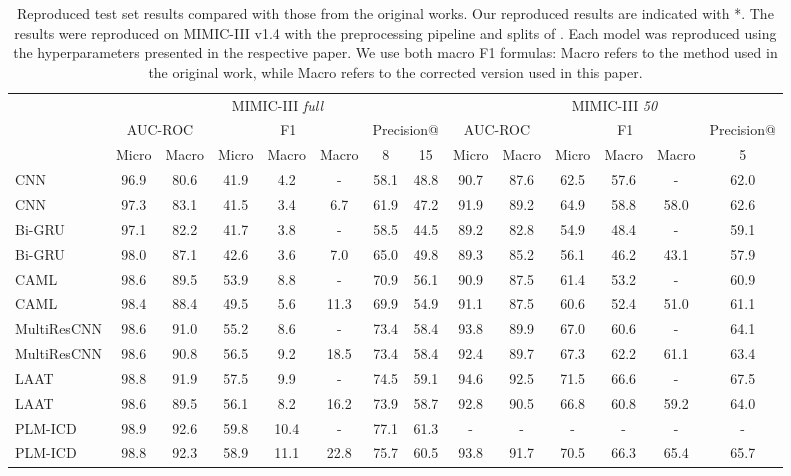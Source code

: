 \documentclass[anonymous=false, sigconf=true, review=false, natbib=true]{acmart}
\begin{document}
\begin{table*}[t]
\centering
\caption{Reproduced test set results compared with those from the original works. Our reproduced results are indicated with *. The results were reproduced on MIMIC-III v1.4 with the preprocessing pipeline and splits of \citet{mullenbachExplainablePredictionMedical2018}. Each model was reproduced using the hyperparameters presented in the respective paper. We use both macro F1 formulas: Macro refers to the method used in the original work, while Macro refers to the corrected version used in this paper.}
\label{tab:reproduced_results}
\begin{tabular}{l  cc  ccc  cc  cc  ccc  c}
    \toprule
     & \multicolumn{7}{c}{MIMIC-III \textit{full}} & \multicolumn{6}{c}{MIMIC-III \textit{50}} \\
     \cmidrule(lr){2-8}\cmidrule(lr){9-14}
     & \multicolumn{2}{c}{AUC-ROC} & \multicolumn{3}{c}{F1} & \multicolumn{2}{c}{Precision@}  & \multicolumn{2}{c}{AUC-ROC} & \multicolumn{3}{c}{F1} & Precision@  \\
     & Micro & Macro & Micro & Macro & Macro & 8 & 15 & Micro & Macro & Micro & Macro & Macro & 5 \\
    \midrule
    CNN &  96.9 & 80.6 &  41.9& 4.2 & -& 58.1 &  48.8  & 90.7 & 87.6 & 62.5 & 57.6 & - & 62.0  \\
    CNN & 97.3 & 83.1 & 41.5 & 3.4 & 6.7 & 61.9 & 47.2 & 91.9 & 89.2 & 64.9 & 58.8 & 58.0 &  62.6 \\
    \hline
    Bi-GRU & 97.1 & 82.2 & 41.7 & 3.8 & - & 58.5 & 44.5  &  89.2 & 82.8 & 54.9 &  48.4 & - &  59.1  \\
    Bi-GRU  & 98.0 & 87.1 & 42.6 & 3.6 & 7.0 & 65.0 & 49.8 & 89.3 & 85.2 & 56.1 & 46.2 & 43.1 & 57.9  \\
    \hline
    CAML  &  98.6 &  89.5 &  53.9 & 8.8 & - &  70.9 &  56.1  & 90.9 & 87.5 &  61.4 &  53.2 & - &   60.9  \\
    CAML & 98.4 & 88.4 & 49.5 & 5.6 & 11.3 & 69.9 & 54.9 & 91.1 & 87.5 & 60.6 & 52.4 & 51.0 & 61.1  \\
    \hline
    MultiResCNN  &  98.6 &  91.0 & 55.2 & 8.6 & - & 73.4 & 58.4  &  93.8 &  89.9 &  67.0 &  60.6 & - &  64.1 \\
    MultiResCNN  & 98.6 & 90.8 & 56.5 & 9.2 & 18.5 & 73.4 & 58.4 & 92.4 & 89.7 & 67.3 & 62.2 & 61.1 & 63.4  \\
    \hline
    LAAT  &  98.8 &  91.9 &  57.5 & 9.9 & - &  74.5 &  59.1  &  94.6 &  92.5 &  71.5 &  66.6 & - &  67.5 \\
    LAAT & 98.6 & 89.5 & 56.1 & 8.2 & 16.2 & 73.9 & 58.7 & 92.8 & 90.5 & 66.8 & 60.8 & 59.2 & 64.0  \\
    \hline
    PLM-ICD  &  98.9 & 92.6 &  59.8 & 10.4 & - &  77.1 &  61.3  & - & - & - & - & - & -  \\
    PLM-ICD & 98.8 & 92.3 & 58.9 & 11.1 & 22.8 & 75.7 & 60.5 & 93.8 & 91.7 & 70.5 & 66.3 & 65.4 & 65.7 \\
    \bottomrule
\end{tabular}
\end{table*}
\end{document}
